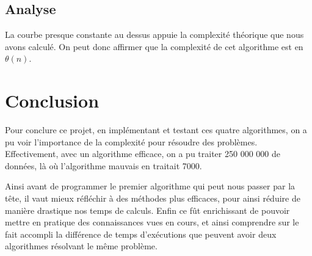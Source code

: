 \documentclass[a4paper, 12pt]{article}
\begin{document}
\subsection{Analyse}
La courbe presque constante au dessus appuie la complexité théorique que nous avons calculé. On peut donc affirmer que la complexité de cet algorithme est en $\theta(n)$. 

\section{Conclusion}
Pour conclure ce projet, en implémentant et testant ces quatre algorithmes, on a pu voir l'importance de la complexité pour résoudre des problèmes. Effectivement, avec un algorithme efficace, on a pu traiter 250 000 000 de données, là où l'algorithme mauvais en traitait 7000. 

Ainsi avant de programmer le premier algorithme qui peut nous passer par la tête, il vaut mieux réfléchir à des méthodes plus efficaces, pour ainsi réduire de manière drastique nos temps de calculs. 
Enfin ce fût enrichissant de pouvoir mettre en pratique des connaissances vues en cours, et ainsi comprendre sur le fait accompli la différence de temps d'exécutions que peuvent avoir deux algorithmes résolvant le même problème.
\end{document}
